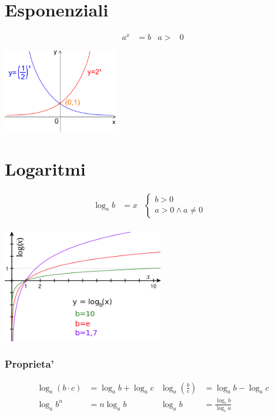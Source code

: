 \documentclass[a4paper]{article}
\begin{document}
	
	\newpage
	\section{Esponenziali}
	\begin{align*}
		a^x &= b		&		a>&0
	\end{align*}
		
	\begin{center}
		\includegraphics[width=5cm]{img/exp.png}
	\end{center}
		
	\section{Logaritmi}

	\begin{align*}
\log_{a}{b} &= x
&
\begin{cases}
b > 0\\
a > 0 \wedge a \ne 0
\end{cases}&\\
\end{align*}
	
	\begin{center}
		\includegraphics[width=7cm]{img/log.png}
	\end{center}
	

	
	\subsubsection{Proprieta'}
	\begin{align*}
		\log_{a}(b \cdot c)                 & = \log_{a} b + \log_{a} c &
		\log_{a} \left( \frac{b}{c} \right) & = \log_{a} b - \log_{a} c \\
		\log_{a} b^n                        & = n \log_{a} b		&
		\log_{a} b 							& = \frac{\log_{c} b}{\log_{c} a}\\
	\end{align*}
\end{document}
